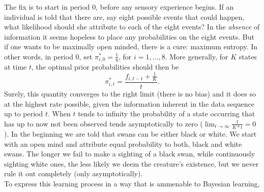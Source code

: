 \documentclass[11pt]{article}
\begin{document}
The fix is to start in period $0$, before any sensory experience begins. If an individual is told that there are, say eight possible events that could happen, what likelihood should she attribute to each of the eight events? In the \textit{absence} of information it seems hopeless to place any probabilities on the eight events. But if one wants to be maximally open minded, there is a cure: maximum entropy.  In other words, in period $0$, set $\pi_{i,0}^{*}=\frac{1}{8}$, for $i=1, \ldots, 8$. More generally, for $K$ states at time $t$, the optimal prior probabilities should then be
\begin{equation}  
\pi_{i, t}^{*}=\frac{f_{i, t-1}+\frac{1}{K}}{t}.
\end{equation}
Surely, this quantity converges to the right limit (there is no bias) and it does so at the highest rate possible, given the information inherent in the data sequence up to period $t$. When $t$ tends to infinity the probability of a state occurring that has up to now not been observed tends asymptotically to zero ($\lim_{t\rightarrow\infty}\frac{1}{K*t}=0$).  In the beginning we are told that swans can be either black or white. We start with an open mind and attribute equal probability to both, black and white swans. The longer we fail to make a sighting of a black swan, while continuously sighting white ones, the less likely we deem the creature's existence, but we never rule it out completely (only asymptotically). 
\\

To express this learning process in a way that is ammenable to Bayesian learning,      


\end{document}
